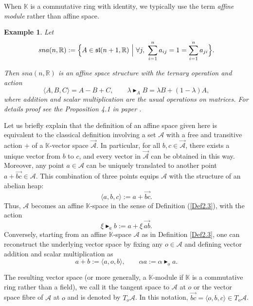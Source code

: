 \documentclass[14pt]{article}
\theoremstyle{Definition}
\newtheorem{Exam}[thm]{Example}
\theoremstyle{remark}
\begin{document}
When $\mathbb{K}$ is a commutative ring with identity, we typically use the term \emph{affine module} rather than affine space.
\begin{Exam}\label{Exam1}
Let
\[
sna(n,\mathbb{R}) := \Bigl\{ A \in \mathfrak{sl}(n+1,\mathbb{R}) \ \Big|\ 
\forall j,\ \sum_{i=1}^{n} a_{ij} = 1 = \sum_{i=1}^{n} a_{ji} \Bigr\}.
\]

Then $sna(n,\mathbb{R})$ is an affine space structure with the ternary operation and action
\[
\langle A,B,C \rangle = A - B + C, \qquad
\lambda \blacktriangleright_{A} B = \lambda B + (1 - \lambda) A,
\]
where addition and scalar multiplication are the usual operations on matrices. For details proof see the Proposition 4.1 in paper \cite{Brz2}.
\end{Exam}
Let us briefly explain that the definition of an affine space given here is equivalent 
to the classical definition involving a set $\mathcal{A}$ with a free and transitive action $+$
of a $\mathbb{K}$-vector space $\overrightarrow{\mathcal{A}}$. In particular, for all $b,c \in \overrightarrow{\mathcal{A}}$, there exists a 
unique vector from $b$ to $c$, and every vector in $\overrightarrow{\mathcal{A}}$ can be obtained in this way. 
Moreover, any point $a \in \mathcal{A}$ can be uniquely translated to another point 
$a + \overrightarrow{bc} \in \mathcal{A}$. This combination of three points equips $\mathcal{A}$ with the 
structure of an abelian heap:
\[
\langle a, b, c \rangle := a + \overrightarrow{bc}.
\]
Thus, $\mathcal{A}$ becomes an affine $\mathbb{K}$-space in the sense of Definition (\ref{Def2.3}), with the action
\[
\xi \blacktriangleright_{a} b := a + \xi \,\overrightarrow{ab}.
\]
Conversely, starting from an affine $\mathbb{K}$-space $\mathcal{A}$ as in Definition \ref{Def2.3}, one can reconstruct the underlying vector space by fixing any $o \in \mathcal{A}$ and defining vector addition and scalar multiplication as
\begin{equation}\label{eq1}
a + b := \langle a, o, b \rangle, \qquad 
\alpha a := \alpha \blacktriangleright_{o} a.
\end{equation}

The resulting vector space (or more generally, a $\mathbb{K}$-module if $\mathbb{K}$ is a commutative ring rather than a field), we call it the tangent space to $\mathcal{A}$ at $o$ or the vector space fibre of $\mathcal{A}$ at $o$ and is denoted by $T_{o}\mathcal{A}$. In this notation, 
$\overrightarrow{bc} = \langle o, b, c \rangle \in T_{o}\mathcal{A}$.
\end{document}
